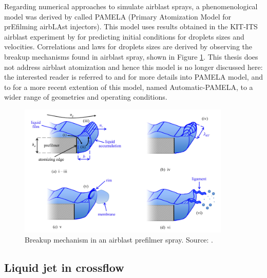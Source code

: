 Regarding numerical approaches to simulate airblast sprays, a phenomenological model was derived by  called PAMELA (Primary Atomization Model for prEfilming airbLAst injectors). This model uses results obtained in the KIT-ITS airblast experiment by  for predicting initial conditions for droplets sizes and velocities. Correlations and laws for droplets sizes are derived by observing the breakup mechanisms found in airblast spray, shown in Figure \ref{fig:airblast_breakup_mechanism_chaussonnet}. This thesis does not address airblast atomization and hence this model is no longer discussed here: the interested reader is referred to  and  for more details into PAMELA model, and to  for a more recent extention of this model, named Automatic-PAMELA, to a wider range of geometries and operating conditions.

\begin{figure}[ht]
    \centering
    \includegraphics[width=0.9\textwidth]{./part1_numerical_approaches/figures_ch3/airblast_breakup_mechanism_chaussonnet}
       \centering
    \caption[Breakup mechanism in an airblast prefilmer spray]{Breakup mechanism in an airblast prefilmer spray. Source: .}
    \label{fig:airblast_breakup_mechanism_chaussonnet}
\end{figure}




\subsection{Liquid jet in crossflow}
\label{ch3:subsec_lagrangian_liquid_JICF}

